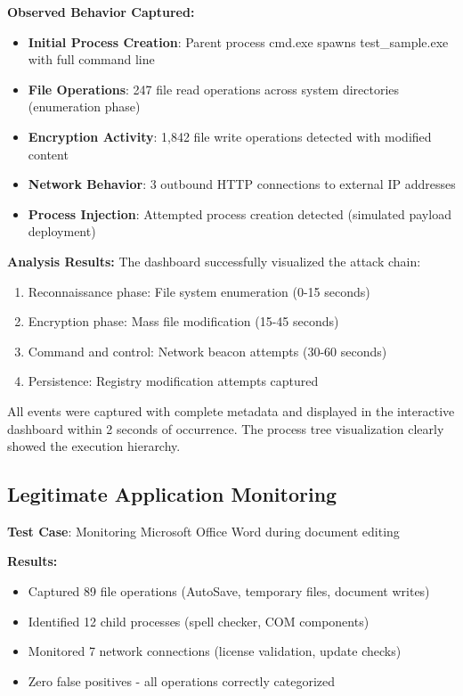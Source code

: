 \textbf{Observed Behavior Captured:}
\begin{itemize}
    \item \textbf{Initial Process Creation}: Parent process cmd.exe spawns test\_sample.exe with full command line
    \item \textbf{File Operations}: 247 file read operations across system directories (enumeration phase)
    \item \textbf{Encryption Activity}: 1,842 file write operations detected with modified content
    \item \textbf{Network Behavior}: 3 outbound HTTP connections to external IP addresses
    \item \textbf{Process Injection}: Attempted process creation detected (simulated payload deployment)
\end{itemize}

\textbf{Analysis Results:}
The dashboard successfully visualized the attack chain:
\begin{enumerate}
    \item Reconnaissance phase: File system enumeration (0-15 seconds)
    \item Encryption phase: Mass file modification (15-45 seconds)
    \item Command and control: Network beacon attempts (30-60 seconds)
    \item Persistence: Registry modification attempts captured
\end{enumerate}

All events were captured with complete metadata and displayed in the interactive dashboard within 2 seconds of occurrence. The process tree visualization clearly showed the execution hierarchy.

\subsection{Legitimate Application Monitoring}

\textbf{Test Case}: Monitoring Microsoft Office Word during document editing

\textbf{Results:}
\begin{itemize}
    \item Captured 89 file operations (AutoSave, temporary files, document writes)
    \item Identified 12 child processes (spell checker, COM components)
    \item Monitored 7 network connections (license validation, update checks)
    \item Zero false positives - all operations correctly categorized
\end{itemize}

